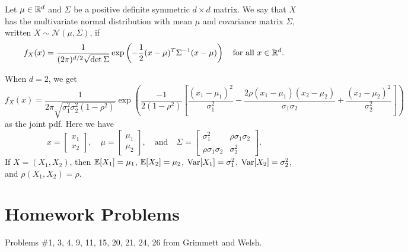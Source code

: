 \begin{definition}
  Let $\mu \in \mathbb{R}^d$ and $\Sigma$ be a
  positive definite symmetric $d \times d$ matrix.
  We say that $X$ has the multivariate
  normal distribution with mean $\mu$ and
  covariance matrix $\Sigma$, written
  $X \sim \mathcal{N}(\mu, \Sigma)$, if
  \[
    f_X(x) = \frac{1}{(2\pi)^{d / 2} \sqrt{\det \Sigma}} \exp\left(-\frac{1}{2}(x - \mu)^T \Sigma^{-1} (x - \mu)\right)
    \quad \text{for all $x \in \mathbb{R}^d$}.
  \]
\end{definition}

\begin{remark}
  When $d = 2$, we get
  \[
    f_X(x) = \frac{1}{2\pi \sqrt{\sigma_1^2 \sigma_2^2 (1 - \rho^2)}}
    \exp\left(\frac{-1}{2(1 - \rho^2)} \left[\frac{(x_1 - \mu_1)^2}{\sigma_1^2} - \frac{2\rho(x_1 - \mu_1)(x_2 - \mu_2)}{\sigma_1 \sigma_2} + \frac{(x_2 - \mu_2)^2}{\sigma_2^2}\right]\right)
  \]
  as the joint pdf. Here we have
  \[
    x =
    \begin{bmatrix}
      x_1 \\ x_2
    \end{bmatrix}, \quad
    \mu =
    \begin{bmatrix}
      \mu_1 \\ \mu_2
    \end{bmatrix}, \quad \text{and} \quad
    \Sigma =
    \begin{bmatrix}
      \sigma_1^2 & \rho \sigma_1 \sigma_2 \\
      \rho \sigma_1 \sigma_2 & \sigma_2^2
    \end{bmatrix}.
  \]
  If $X = (X_1, X_2)$, then $\mathbb{E}[X_1] = \mu_1$,
  $\mathbb{E}[X_2] = \mu_2$, $\operatorname{Var}[X_1] = \sigma_1^2$,
  $\operatorname{Var}[X_2] = \sigma_2^2$, and $\rho(X_1, X_2) = \rho$.
\end{remark}

\section{Homework Problems}
Problems \#1, 3, 4, 9, 11, 15, 20, 21, 24, 26
from Grimmett and Welsh.
